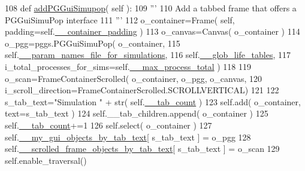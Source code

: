 \begin{DoxyCode}
108     \textcolor{keyword}{def }\hyperlink{classnegui_1_1pghostnotebook_1_1PGHostNotebook_af595ed4592e623ef403a5e9e7c1e930e}{addPGGuiSimupop}( self ):
109         \textcolor{stringliteral}{'''}
110 \textcolor{stringliteral}{        Add a tabbed frame that offers a PGGuiSimuPop interface}
111 \textcolor{stringliteral}{        '''}
112         o\_container=Frame( self, padding=self.\hyperlink{classnegui_1_1pghostnotebook_1_1PGHostNotebook_a790570fc06951c4ccc142a26c01668ef}{\_\_container\_padding} )
113         o\_canvas=Canvas( o\_container )
114         o\_pgg=pggs.PGGuiSimuPop( o\_container, 
115                         self.\hyperlink{classnegui_1_1pghostnotebook_1_1PGHostNotebook_a9b145ef56ff954c480d856859fcda86e}{\_\_param\_names\_file\_for\_simulations}, 
116                         self.\hyperlink{classnegui_1_1pghostnotebook_1_1PGHostNotebook_af63d9ae9cde1ec2155d4dc81934d00c7}{\_\_glob\_life\_tables}, 
117                         i\_total\_processes\_for\_sims=self.\hyperlink{classnegui_1_1pghostnotebook_1_1PGHostNotebook_a14287e3e1cf5c33d9be0ff28d031fc04}{\_\_max\_process\_total} )
118 
119         o\_scan=FrameContainerScrolled( o\_container, o\_pgg, o\_canvas, 
120                             i\_scroll\_direction=FrameContainerScrolled.SCROLLVERTICAL)
121         
122         s\_tab\_text=\textcolor{stringliteral}{"Simulation "} + str( self.\hyperlink{classnegui_1_1pghostnotebook_1_1PGHostNotebook_a84a7417cc57500cbe5c230449ba464b3}{\_\_tab\_count} )
123         self.add( o\_container, text=s\_tab\_text )
124         self.\_\_tab\_children.append( o\_container )
125         self.\hyperlink{classnegui_1_1pghostnotebook_1_1PGHostNotebook_a84a7417cc57500cbe5c230449ba464b3}{\_\_tab\_count}+=1
126         self.select( o\_container )
127         self.\hyperlink{classnegui_1_1pghostnotebook_1_1PGHostNotebook_af4966fb6fc80c08cd38bf21b2c723364}{\_\_my\_gui\_objects\_by\_tab\_text}[ s\_tab\_text ] = o\_pgg 
128         self.\hyperlink{classnegui_1_1pghostnotebook_1_1PGHostNotebook_a5f9ed267b317c56e1da89ef894a2b52a}{\_\_scrolled\_frame\_objects\_by\_tab\_text}[ s\_tab\_text ] = 
      o\_scan
129         self.enable\_traversal()
\end{DoxyCode}
